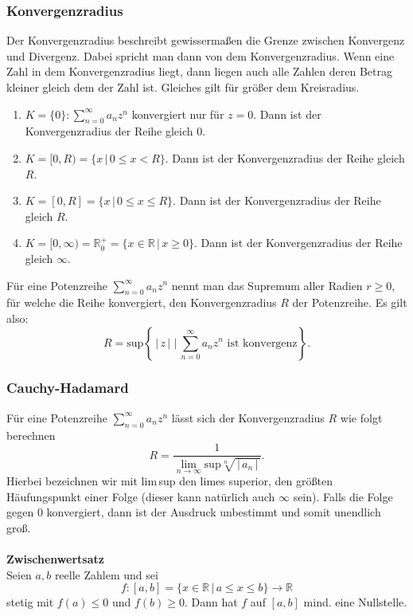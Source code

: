 \documentclass[a4paper,12pt]{article}
\begin{document}
\subsubsection{Konvergenzradius}
Der Konvergenzradius beschreibt gewissermaßen die Grenze zwischen Konvergenz und Divergenz. Dabei spricht man dann von dem Konvergenzradius. Wenn eine Zahl in dem Konvergenzradius liegt, dann liegen auch alle Zahlen deren Betrag kleiner gleich dem der Zahl ist. Gleiches gilt für größer dem Kreisradius.
\begin{enumerate}[label=(\alph*)]
        \item $K=\{0\}:\sum_{n=0}^{\infty}a_nz^n$ konvergiert nur für $z=0$. Dann ist der Konvergenzradius der Reihe gleich 0.
        \item $K=[0,R)=\{x\,|\, 0\leq x<R\}$. Dann ist der Konvergenzradius der Reihe gleich $R$.
        \item $K=[0,R]=\{x\,|\, 0\leq x\leq R\}$. Dann ist der Konvergenzradius der Reihe gleich $R$.
        \item $K=[0,\infty)=\mathbb{R}_0^+=\{x \in \mathbb{R}\,|\, x\geq 0\}$. Dann ist der Konvergenzradius der Reihe gleich $\infty$.
\end{enumerate}
Für eine Potenzreihe $\sum_{n=0}^{\infty}a_nz^n$ nennt man das Supremum aller Radien $r\geq 0$, für welche die Reihe konvergiert, den Konvergenzradius $R$ der Potenzreihe. Es gilt also:
\[ 
        R=\text{sup}\left\{\,|\, z\,|\, \,|\, \sum_{n=0}^{\infty}a_nz^n \text{ ist konvergenz}\right\}
.\] 
\subsubsection{Cauchy-Hadamard}
Für eine Potenzreihe $\sum_{n=0}^{\infty}a_nz^n$ lässt sich der Konvergenzradius $R$ wie folgt berechnen
\[ 
        R=\dfrac{1}{\lim_{n\rightarrow \infty}\text{sup}\sqrt[n]{\,|\, a_n\,|\, }}
.\] 
Hierbei bezeichnen wir mit lim\,sup den limes superior, den größten Häufungspunkt einer Folge (dieser kann natürlich auch $\infty$ sein). Falls die Folge gegen $0$ konvergiert, dann ist der Ausdruck unbestimmt und somit unendlich groß.
\\\hfill\\\textbf{Zwischenwertsatz}\\ 
Seien $a,b$ reelle Zahlem und sei
\[ 
        f:[a,b]=\{x \in \mathbb{R}\,|\, a\leq x\leq b\}\rightarrow \mathbb{R}
\] 
stetig mit $f\left(a\right)\leq 0$ und $f\left(b\right)\geq 0$. Dann hat $f$ auf $[a,b]$ mind. eine Nullstelle.
\end{document}
